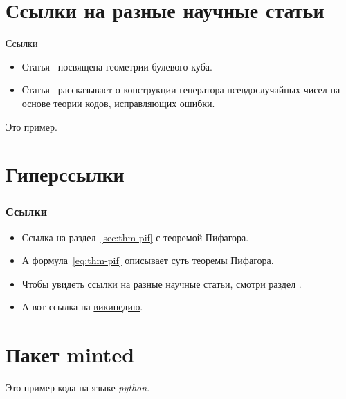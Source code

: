 \documentclass{../cmcbeamer}
\begin{document}
\section{Ссылки на разные научные статьи}\label{sec:ref-to-articles}

\begin{frame}{Ссылки}
  \begin{example}\label{ex:example:refs}
    \begin{itemize}
    \item Статья~\cite{ahlswede1977} посвящена геометрии булевого
      куба.
    \item Статья~\cite{ahmed2013} рассказывает о конструкции
      генератора псевдослучайных чисел на основе теории кодов,
      исправляющих ошибки.
    \end{itemize}
  \end{example}

  \begin{example}
    Это пример.
  \end{example}
\end{frame}


\section{Гиперссылки}\label{sec:hyper}

\begin{frame}
  \frametitle{Ссылки}

  \begin{itemize}
  \item<1-> Ссылка на раздел~\ref{sec:thm-pif} с теоремой Пифагора.
  \item<2-> А формула~\eqref{eq:thm-pif} описывает суть теоремы
    Пифагора.
  \item<3-> Чтобы увидеть ссылки на разные научные статьи, смотри
    раздел \hyperref[sec:ref-to-articles]{}.
  \item<2-> А вот ссылка на
    \href{https://ru.wikipedia.org}{википедию}.
  \end{itemize}
\end{frame}

\if \MINTED\empty
\else
\section{Пакет minted}\label{sec:minted}

\begin{example}\label{ex:example:minted}
  Это пример кода на языке \emph{python}.
  \inputminted{python}{code.py}
\end{example}
\fi
\end{document}
